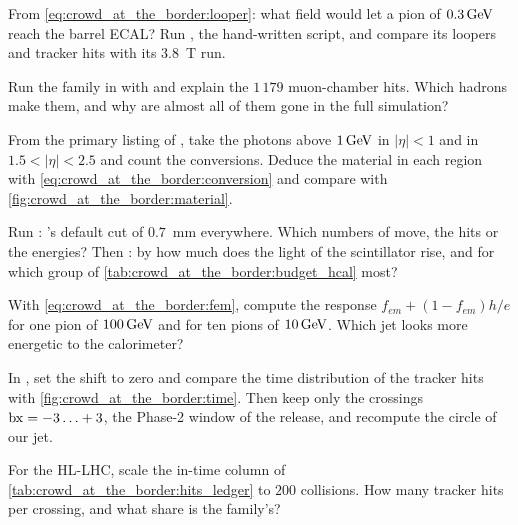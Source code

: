 \begin{exercises}
\item From \cref{eq:crowd_at_the_border:looper}: what field would let a
  pion of $0.3\,\mathrm{GeV}$ reach the barrel ECAL? Run
  , the hand-written
  script, and compare its loopers and tracker hits with its $3.8$~T run.
\item Run the family in \GEANT with 
  and explain the $1\,179$ muon-chamber hits. Which hadrons make
  them, and why are almost all of them gone in the full simulation?
\item From the primary listing of , take the photons
  above $1\,\mathrm{GeV}$ in $|\eta|<1$ and in $1.5<|\eta|<2.5$ and count the
  conversions. Deduce the material in each region with
  \cref{eq:crowd_at_the_border:conversion} and compare with
  \cref{fig:crowd_at_the_border:material}.
\item Run : \GEANT's default
  cut of $0.7$~mm everywhere. Which numbers of  move,
  the hits or the energies? Then : by how much does the
  light of the scintillator rise, and for which group of
  \cref{tab:crowd_at_the_border:budget_hcal} most?
\item With \cref{eq:crowd_at_the_border:fem}, compute the response
  $f_{em}+(1-f_{em})h/e$ for one pion of $100\,\mathrm{GeV}$ and for ten pions of
  $10\,\mathrm{GeV}$. Which jet looks more energetic to the calorimeter?
\item In , set the shift to zero and compare the time
  distribution of the tracker hits with \cref{fig:crowd_at_the_border:time}.
  Then keep only the crossings $\mathrm{bx}=-3\ldots+3$, the Phase-2 window of the
  release, and recompute the circle of our jet.
\item For the HL-LHC, scale the in-time column of
  \cref{tab:crowd_at_the_border:hits_ledger} to $200$ collisions. How many
  tracker hits per crossing, and what share is the family's?
\end{exercises}

